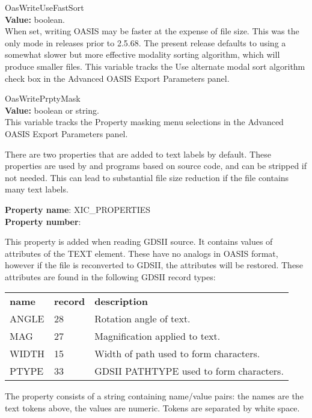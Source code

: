 \begin{description}
\item{\et OasWriteUseFastSort}\\
{\bf Value:} boolean.\\
When set, writing OASIS may be faster at the expense of file size. 
This was the only mode in releases prior to 2.5.68.  The present
release defaults to using a somewhat slower but more effective
modality sorting algorithm, which will produce smaller files.  This
variable tracks the {\cb Use alternate modal sort algorithm} check box
in the {\cb Advanced OASIS Export Parameters} panel.

\item{\et OasWritePrptyMask}\\
{\bf Value:} boolean or string.\\
This variable tracks the {\cb Property masking} menu selections in the
{\cb Advanced OASIS Export Parameters} panel.

There are two properties that are added to text labels by default. 
These properties are used by {\Xic} and programs based on {\Xic}
source code, and can be stripped if not needed.  This can lead to
substantial file size reduction if the file contains many text labels.

{\bf Property name}: {\vt XIC\_PROPERTIES}\\
{\bf Property number}: {}

This property is added when reading GDSII source.  It contains values
of attributes of the TEXT element.  These have no analogs in OASIS
format, however if the file is reconverted to GDSII, the attributes
will be restored.  These attributes are found in the following GDSII
record types:

\begin{tabular}{lll}
\bf name & \bf record & \bf description\\
ANGLE & 28 & Rotation angle of text.\\
MAG & 27 & Magnification applied to text.\\
WIDTH & 15 & Width of path used to form characters.\\
PTYPE & 33 & GDSII PATHTYPE used to form characters.\\
\end{tabular}

The property consists of a string containing name/value pairs:  the
names are the text tokens above, the values are numeric.  Tokens are
separated by white space.


\end{description}
